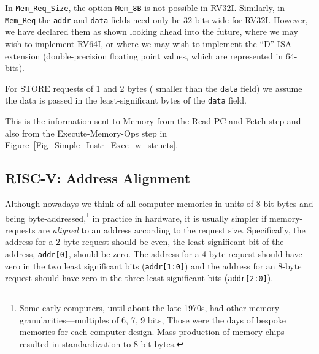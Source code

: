 In \verb|Mem_Req_Size|, the option \verb|Mem_8B| is not possible in
RV32I.  Similarly, in \verb|Mem_Req| the \verb|addr| and \verb|data|
fields need only be 32-bits wide for RV32I.  However, we have declared
them as shown looking ahead into the future, where we may wish to
implement RV64I, or where we may wish to implement the ``D'' ISA
extension (double-precision floating point values, which are
represented in 64-bits).

For STORE requests of 1 and 2 bytes ({\ie} smaller than the \verb|data|
field) we assume the data is passed in the least-significant bytes of
the \verb|data| field.

This is the information sent to Memory from the Read-PC-and-Fetch step
and also from the Execute-Memory-Ops step in
Figure~\ref{Fig_Simple_Instr_Exec_w_structs}.


\subsection{RISC-V: Address Alignment}


Although nowadays we think of all computer memories in units of 8-bit
bytes and being byte-addressed,\footnote{Some early computers, until
about the late 1970s, had other memory granularities---multiples of 6,
7, 9 bits, {\etc} Those were the days of bespoke memories for each
computer design.  Mass-production of memory chips resulted in
standardization to 8-bit bytes.} in practice in hardware, it is
usually simpler if memory-requests are \emph{aligned} to an address
according to the request size.  Specifically, the address for a 2-byte
request should be even, {\ie} the least significant bit of the
address, \verb|addr[0]|, should be zero.  The address for a 4-byte
request should have zero in the two least significant bits
(\verb|addr[1:0]|) and the address for an 8-byte request should have
zero in the three least significant bits (\verb|addr[2:0]|).

